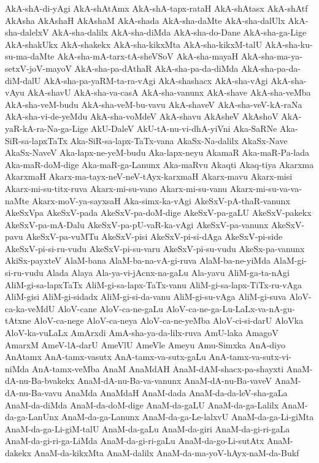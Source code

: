 {AkA-shA-di-yAgi
AkA-shAtAmx
AkA-shA-tapx-rataH
AkA-shAtasx
AkA-shAtf
AkAsha
AkAshaH
AkAshaM
AkA-shada
AkA-sha-daMte
AkA-sha-dalUlx
AkA-sha-dalelxV
AkA-sha-dalilx
AkA-sha-diMda
AkA-sha-do-Dane
AkA-sha-ga-Lige
AkA-shakUkx
AkA-shakekx
AkA-sha-kikxMta
AkA-sha-kikxM-talU
AkA-sha-ku-su-ma-daMte
AkA-sha-mA-tarx-tA-sheVSoV
AkA-sha-mayaH
AkA-sha-ma-ya-setxV-joV-mayoV
AkA-sha-pa-dAthaR
AkA-sha-pa-da-diMda
AkA-sha-pa-da-diM-dalU
AkA-sha-pa-yaRM-ta-ra-vAgi
AkA-shashacx
AkA-sha-vAgi
AkA-sha-vAyu
AkA-shavU
AkA-sha-va-casA
AkA-sha-vanunx
AkA-shave
AkA-sha-veMba
AkA-sha-veM-budu
AkA-sha-veM-bu-vavu
AkA-shaveV
AkA-sha-veV-kA-raNa
AkA-sha-vi-de-yeMdu
AkA-sha-voMdeV
AkA-shavu
AkAsheV
AkAshoV
AkA-yaR-kA-ra-Na-ga-Lige
AkU-DaleV
AkU-tA-nu-vi-dhA-yiVni
Aka-SaRNe
Aka-SiR-sa-lapxTaTx
Aka-SiR-sa-lapx-TaTx-vana
AkaSx-Na-dalilx
AkaSx-Nave
AkaSx-NaveV
Aka-lapx-ne-yeM-budu
Aka-lapx-neyu
AkamaR
Aka-maR-Pa-lada
Aka-maR-doM-dige
Aka-maR-ga-Lanunx
Aka-maRvu
Akaqti
Akaq-tiya
Akarxma
AkarxmaH
Akarx-ma-tayx-neV-neV-tAyx-karxmaH
Akarx-mavu
Akarx-misi
Akarx-mi-su-titx-ruva
Akarx-mi-su-vano
Akarx-mi-su-vanu
Akarx-mi-su-va-va-naMte
Akarx-moV-ya-sayxsaH
Aka-simx-ka-vAgi
AkeSxV-pA-thaR-vanunx
AkeSxVpa
AkeSxV-pada
AkeSxV-pa-doM-dige
AkeSxV-pa-gaLU
AkeSxV-pakekx
AkeSxV-pa-mA-Dalu
AkeSxV-pa-pU-vaR-ka-vAgi
AkeSxV-pa-vanunx
AkeSxV-pavu
AkeSxV-pa-vuMTu
AkeSxV-pisi
AkeSxV-pi-si-dAga
AkeSxV-pi-side
AkeSxV-pi-si-ru-vudu
AkeSxV-pi-su-varu
AkeSxV-pi-su-vudu
AkeSx-pa-vanunx
AkiSx-payxteV
AlaM-bana
AlaM-ba-na-vA-gi-ruva
AlaM-ba-ne-yiMda
AlaM-gi-si-ru-vudu
Alada
Alaya
Ala-ya-vi-jAcnx-na-gaLu
Ala-yavu
AliM-ga-ta-nAgi
AliM-gi-sa-lapxTaTx
AliM-gi-sa-lapx-TaTx-vanu
AliM-gi-sa-lapx-TiTx-ru-vAga
AliM-gisi
AliM-gi-sidadx
AliM-gi-si-da-vanu
AliM-gi-su-vAga
AliM-gi-suva
AloV-ca-ka-veMdU
AloV-cane
AloV-ca-ne-gaLu
AloV-ca-ne-ga-Lu-LaLx-va-nA-gu-tAtxne
AloV-ca-nege
AloV-ca-neya
AloV-ca-ne-yeMba
AloV-ci-si-darU
AloVka
AloV-ka-vuLaLx
AmArxdi
AmA-sha-ya-da-lilx-ruva
AmU-laka
AmagoV
AmarxM
AmeV-lA-darU
AmeVlU
AmeVle
Ameyu
Amu-Simxka
AnA-diyo
AnAtamx
AnA-tamx-vasutx
AnA-tamx-va-sutx-gaLu
AnA-tamx-va-sutx-vi-niMda
AnA-tamx-veMba
AnaM
AnaMdAH
AnaM-dAM-shacx-pa-shayxti
AnaM-dA-nu-Ba-bvakekx
AnaM-dA-nu-Ba-va-vanunx
AnaM-dA-nu-Ba-vaveV
AnaM-dA-nu-Ba-vavu
AnaMda
AnaMdaH
AnaM-dada
AnaM-da-da-leV-sha-gaLa
AnaM-da-diMda
AnaM-da-doM-dige
AnaM-da-gaLU
AnaM-da-ga-Lalilx
AnaM-da-ga-LanUnx
AnaM-da-ga-Lanunx
AnaM-da-ga-Le-lalxvU
AnaM-da-ga-Li-giMta
AnaM-da-ga-Li-giM-talU
AnaM-da-gaLu
AnaM-da-giri
AnaM-da-gi-ri-gaLa
AnaM-da-gi-ri-ga-LiMda
AnaM-da-gi-ri-gaLu
AnaM-da-go-Li-sutAtx
AnaM-dakekx
AnaM-da-kikxMta
AnaM-dalilx
AnaM-da-ma-yoV-hAyx-naM-da-Bukf
}
